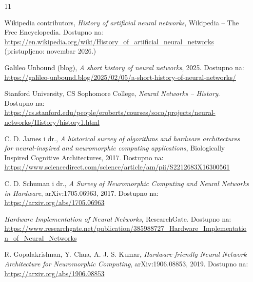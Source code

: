 \begin{thebibliography}{11}

    Wikipedia contributors,
    \textit{History of artificial neural networks},
    Wikipedia -- The Free Encyclopedia.
    Dostupno na: \url{https://en.wikipedia.org/wiki/History_of_artificial_neural_networks}
    (pristupljeno: novembar 2026.)

    Galileo Unbound (blog),
    \textit{A short history of neural networks}, 2025.
    Dostupno na: \url{https://galileo-unbound.blog/2025/02/05/a-short-history-of-neural-networks/}

    Stanford University, CS Sophomore College,
    \textit{Neural Networks -- History}.
    Dostupno na: \url{https://cs.stanford.edu/people/eroberts/courses/soco/projects/neural-networks/History/history1.html}

    C. D. James i dr.,
    \textit{A historical survey of algorithms and hardware architectures for neural-inspired
        and neuromorphic computing applications},
    Biologically Inspired Cognitive Architectures, 2017.
    Dostupno na: \url{https://www.sciencedirect.com/science/article/am/pii/S2212683X16300561}

    C. D. Schuman i dr.,
    \textit{A Survey of Neuromorphic Computing and Neural Networks in Hardware},
    arXiv:1705.06963, 2017.
    Dostupno na: \url{https://arxiv.org/abs/1705.06963}

    \textit{Hardware Implementation of Neural Networks}, ResearchGate.
    Dostupno na: \url{https://www.researchgate.net/publication/385988727_Hardware_Implementation_of_Neural_Networks}

    R. Gopalakrishnan, Y. Chua, A. J. S. Kumar,
    \textit{Hardware-friendly Neural Network Architecture for Neuromorphic Computing},
    arXiv:1906.08853, 2019.
    Dostupno na: \url{https://arxiv.org/abs/1906.08853}


\end{thebibliography}
